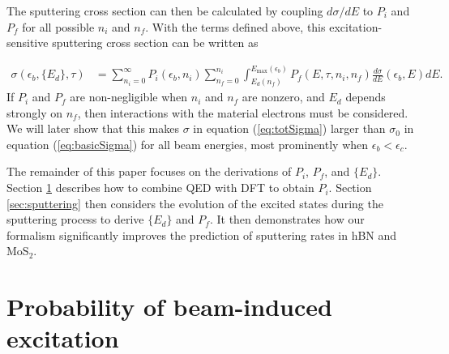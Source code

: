 \documentclass{article}
\begin{document}
\noindent
The sputtering cross section can then be calculated by coupling $d\sigma/dE$ to
$P_i$ and $P_f$ for all possible $n_i$ and $n_f$.
With the terms defined above, this excitation-sensitive sputtering
cross section can be written as

\begin{equation}
  \begin{aligned}
    \sigma(\epsilon_b, \{{E}_d\}, \tau)
    &=
    \sum_{n_i=0}^\infty
    P_i(\epsilon_b, n_i)
    \sum_{n_f=0}^{n_i}
    \int_{E_d(n_f)}^{E_\text{max}(\epsilon_b)}
    P_f(E, \tau, n_i, n_f)
    \frac{d\sigma}{dE}(\epsilon_b, E)
    dE.
  \end{aligned}
  \label{eq:totSigma}
\end{equation}
%
If $P_i$ and $P_f$ are non-negligible when $n_i$ and $n_f$ are nonzero, and
$E_d$ depends strongly on $n_f$, then interactions with the material electrons
must be considered.
We will later show that this makes $\sigma$ in equation (\ref{eq:totSigma})
larger than $\sigma_0$ in equation (\ref{eq:basicSigma}) for all beam energies,
most prominently when $\epsilon_b < \epsilon_c$.

The remainder of this paper focuses on the derivations of $P_i$, $P_f$, and
$\{E_d\}$.
Section \ref{sec:probability} describes how to combine QED with DFT to obtain
$P_i$.
Section \ref{sec:sputtering} then considers the evolution of the excited states
during the sputtering process to derive $\{E_d\}$ and $P_f$. It then demonstrates
how our formalism significantly improves the prediction of sputtering rates in
hBN and MoS$_2$.

\section{Probability of beam-induced excitation} 
\label{sec:probability}
\end{document}
